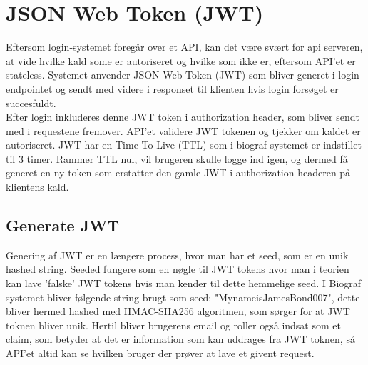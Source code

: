 ﻿\section{JSON Web Token (JWT)}
Eftersom login-systemet foregår over et API, kan det være svært for api serveren, at vide hvilke kald some er autoriseret
og hvilke som ikke er, eftersom API'et er stateless. Systemet anvender JSON Web Token (JWT)
som bliver generet i login endpointet og sendt med videre i responset til klienten hvis login forsøget er succesfuldt.\\

Efter login inkluderes denne JWT token i authorization header, som bliver sendt med i requestene fremover.
API'et validere JWT tokenen og tjekker om kaldet er autoriseret. JWT har en Time To Live (TTL) som i biograf systemet
er indstillet til 3 timer. Rammer TTL nul, vil brugeren skulle logge ind igen, og dermed få generet en ny token som erstatter den
gamle JWT i authorization headeren på klientens kald.\\ 

\subsection{Generate JWT}
Genering af JWT er en længere process, hvor man har et seed, som er en unik hashed string. Seeded fungere som en nøgle
til JWT tokens hvor man i teorien kan lave 'falske' JWT tokens hvis man kender til dette hemmelige seed. I Biograf systemet
bliver følgende string brugt som seed: "MynameisJamesBond007", dette bliver hermed hashed med HMAC-SHA256 algoritmen, 
som sørger for at JWT toknen bliver unik. Hertil bliver brugerens email og roller også indsat som et claim, som betyder
at det er information som kan uddrages fra JWT toknen, så API'et altid kan se hvilken bruger der prøver at lave et givent
request.\\